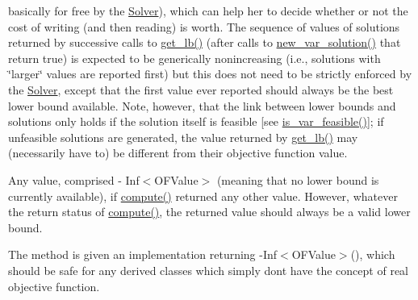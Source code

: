 \begin{DoxyItemize}
basically for free by the \mbox{\hyperlink{class_s_m_spp__di__unipi__it_1_1_solver}{Solver}}), which can help her to decide whether or not the cost of writing (and then reading) is worth. The sequence of values of solutions returned by successive calls to \mbox{\hyperlink{class_s_m_spp__di__unipi__it_1_1_solver_a4a4dbe4c2416d531c4619ca94fc07d31}{get\+\_\+lb()}} (after calls to \mbox{\hyperlink{class_s_m_spp__di__unipi__it_1_1_solver_af109b504a566c90a4ea45c1574c128fe}{new\+\_\+var\+\_\+solution()}} that return true) is expected to be generically nonincreasing (i.\+e., solutions with \char`\"{}larger\char`\"{} values are reported first) but this does not need to be strictly enforced by the \mbox{\hyperlink{class_s_m_spp__di__unipi__it_1_1_solver}{Solver}}, except that the first value ever reported should always be the best lower bound available. Note, however, that the link between lower bounds and solutions only holds if the solution itself is feasible \mbox{[}see \mbox{\hyperlink{class_s_m_spp__di__unipi__it_1_1_solver_a038fa1e554e91724e1ce3f593aba55fd}{is\+\_\+var\+\_\+feasible()}}\mbox{]}; if unfeasible solutions are generated, the value returned by \mbox{\hyperlink{class_s_m_spp__di__unipi__it_1_1_solver_a4a4dbe4c2416d531c4619ca94fc07d31}{get\+\_\+lb()}} may (necessarily have to) be different from their objective function value.
\item Any value, comprised -\/ Inf$<$\+O\+F\+Value$>$ (meaning that no lower bound is currently available), if \mbox{\hyperlink{class_s_m_spp__di__unipi__it_1_1_solver_a504d4e3e174c7a518cc66156a8a45ce5}{compute()}} returned any other value. However, whatever the return status of \mbox{\hyperlink{class_s_m_spp__di__unipi__it_1_1_solver_a504d4e3e174c7a518cc66156a8a45ce5}{compute()}}, the returned value should always be a valid lower bound.
\end{DoxyItemize}

The method is given an implementation returning -\/\+Inf$<$\+O\+F\+Value$>$(), which should be safe for any derived classes which simply don\textquotesingle{}t have the concept of real objective function. \mbox{\label{class_s_m_spp__di__unipi__it_1_1_solver_a842fd454acaded84baf6b77e0d61a950}} 
